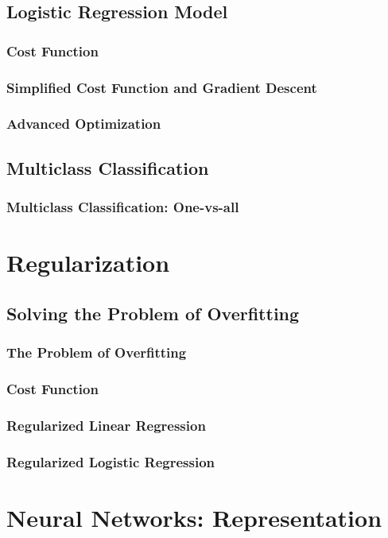 \documentclass{article}
\begin{document}
\subsection{Logistic Regression Model}
\subsubsection{Cost Function}
\subsubsection{Simplified Cost Function and Gradient Descent}
\subsubsection{Advanced Optimization}
\subsection{Multiclass Classification}
\subsubsection{Multiclass Classification: One-vs-all}

\newpage

\section{Regularization}
\subsection{Solving the Problem of Overfitting}
\subsubsection{The Problem of Overfitting}
\subsubsection{Cost Function}
\subsubsection{Regularized Linear Regression}
\subsubsection{Regularized Logistic Regression}

\section{Neural Networks: Representation}
\end{document}
